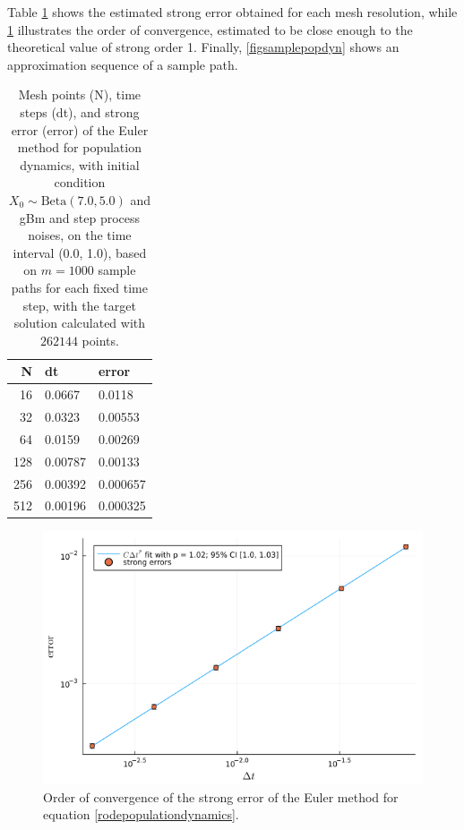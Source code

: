 \documentclass[reqno,12pt]{amsart}
\theoremstyle{plain} %
\theoremstyle{definition} %
\begin{document}
Table \ref{tabpopdyn} shows the estimated strong error obtained for each mesh resolution, while \cref{figpopdyn} illustrates the order of convergence, estimated to be close enough to the theoretical value of strong order 1. Finally, \cref{figsamplepopdyn} shows an approximation sequence of a sample path.

\begin{table}
    \begin{tabular}[htb]{|r|l|l|}
        \hline N & dt & error\\
        \hline \hline
        16 & 0.0667 & 0.0118 \\
        32 & 0.0323 & 0.00553 \\
        64 & 0.0159 & 0.00269 \\
        128 & 0.00787 & 0.00133 \\
        256 & 0.00392 & 0.000657 \\
        512 & 0.00196 & 0.000325 \\
        \hline
    \end{tabular}
    \bigskip

    \caption{Mesh points (N), time steps (dt), and strong error (error) of the Euler method for population dynamics, with initial condition $X_0 \sim \mathrm{Beta}(7.0, 5.0)$ and gBm and step process noises, on the time interval (0.0, 1.0), based on $m = 1000$ sample paths for each fixed time step, with the target solution calculated with $262144$ points.}
    \label{tabpopdyn}
\end{table}

\begin{figure}[htb]
    \includegraphics[scale=0.4]{img/order_popdyn_gBmPoisson.png}
    \caption{Order of convergence of the strong error of the Euler method for equation \eqref{rodepopulationdynamics}.}
    \label{figpopdyn}
\end{figure}
\end{document}

